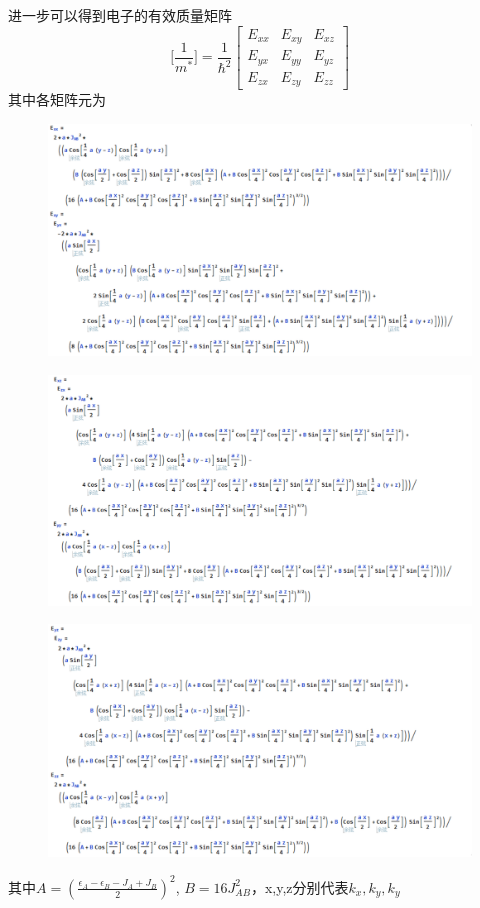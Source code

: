 \documentclass{article}
\begin{document}
进一步可以得到电子的有效质量矩阵
\begin{equation}
	\big[\frac{1}{m^*}\big]=\frac{1}{\hbar^2}
	\left[
	\begin{matrix}
		E_{xx}& E_{xy}& E_{xz}\\
		E_{yx}& E_{yy}& E_{yz}\\
		E_{zx}& E_{zy}& E_{zz}
	\end{matrix}\right]
\end{equation}
其中各矩阵元为
	\begin{figure}[!h]
	\centering
	\includegraphics[scale=0.75]{m1}
\end{figure}
	\begin{figure}[!h]
	\centering
	\includegraphics[scale=0.75]{m2}
\end{figure}
	\begin{figure}[!h]
	\centering
	\includegraphics[scale=0.75]{m3}
\end{figure}
其中$ A=(\frac{\epsilon_A-\epsilon_B-J_A+J_B}{2})^2 $, $ B=16J_{AB}^2 $，x,y,z分别代表$ k_x, k_y, k_y $
\end{document}
